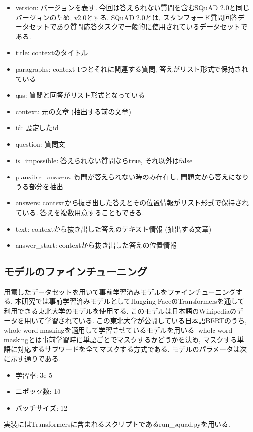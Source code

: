 \begin{itemize}
  \item version: バージョンを表す. 今回は答えられない質問を含むSQuAD 2.0と同じバージョンのため, v2.0とする. SQuAD 2.0とは, スタンフォード質問回答データセットであり質問応答タスクで一般的に使用されているデータセットである. 
  \item title: contextのタイトル
  \item paragraphs: context 1つとそれに関連する質問, 答えがリスト形式で保持されている
  \item qas: 質問と回答がリスト形式となっている
  \item context: 元の文章 (抽出する前の文章) 
  \item id: 設定したid
  \item question: 質問文
  \item is\_impossible: 答えられない質問ならtrue, それ以外はfalse
  \item plausible\_answers: 質問が答えられない時のみ存在し, 問題文から答えになりうる部分を抽出
  \item answers: contextから抜き出した答えとその位置情報がリスト形式で保持されている. 答えを複数用意することもできる. 
  \item text: contextから抜き出した答えのテキスト情報 (抽出する文章) 
  \item answer\_start: contextから抜き出した答えの位置情報
\end{itemize}

\subsection{モデルのファインチューニング}
用意したデータセットを用いて事前学習済みモデルをファインチューニングする. 本研究では事前学習済みモデルとしてHugging FaceのTransformersを通して利用できる東北大学のモデル\cite{tohoku}を使用する. このモデルは日本語のWikipediaのデータを用いて学習されている\cite{tohoku}. 
この東北大学が公開している日本語BERTのうち, whole word maskingを適用して学習させているモデル\cite{masking}を用いる. whole word maskingとは事前学習時に単語ごとでマスクするかどうかを決め, マスクする単語に対応するサブワードを全てマスクする方式である. モデルのパラメータは次に示す通りである. 
\begin{itemize}
  \item 学習率: 3e-5
  \item エポック数: 10
  \item バッチサイズ: 12
\end{itemize}
実装にはTransformersに含まれるスクリプトであるrun\_squad.pyを用いる. 

